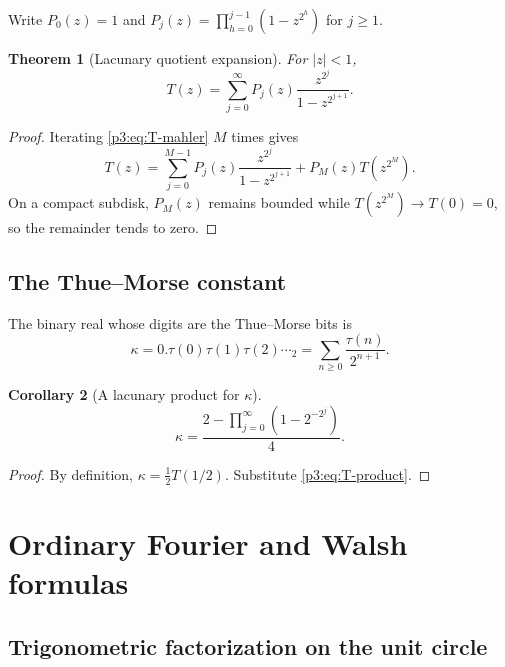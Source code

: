 \documentclass[11pt,oneside]{article}
\newtheorem{theorem}{Theorem}[section]
\newtheorem{corollary}[theorem]{Corollary}
\theoremstyle{definition}
\theoremstyle{remark}
\newcommand{\1}{\mathbf 1}
\begin{document}
Write \(P_0(z)=1\) and \(P_j(z)=\prod_{h=0}^{j-1}(1-z^{2^h})\) for \(j\ge1\).

\begin{theorem}[Lacunary quotient expansion]
\label{p3:thm:lacunary-quotient}
For \(|z|<1\),
\begin{equation}
 \boxed{
 T(z)=\sum_{j=0}^{\infty}
 P_j(z)\frac{z^{2^j}}{1-z^{2^{j+1}}}.}
 \label{p3:eq:lacunary-quotient}
\end{equation}
\end{theorem}

\begin{proof}
Iterating \eqref{p3:eq:T-mahler} \(M\) times gives
\[
 T(z)=\sum_{j=0}^{M-1}P_j(z)\frac{z^{2^j}}{1-z^{2^{j+1}}}
      +P_M(z)T(z^{2^M}).
\]
On a compact subdisk, \(P_M(z)\) remains bounded while \(T(z^{2^M})\to T(0)=0\), so the
remainder tends to zero.
\end{proof}

\subsection{The Thue--Morse constant}

The binary real whose digits are the Thue--Morse bits is
\begin{equation}
 \kappa=0.\tau(0)\tau(1)\tau(2)\cdots{}_2
       =\sum_{n\ge0}\frac{\tau(n)}{2^{n+1}}.
 \label{p3:eq:kappa-def}
\end{equation}

\begin{corollary}[A lacunary product for \(\kappa\)]
\label{p3:cor:kappa}
\begin{equation}
 \boxed{
 \kappa=\frac{2-\displaystyle\prod_{j=0}^{\infty}
                    \left(1-2^{-2^j}\right)}4.}
 \label{p3:eq:kappa-product}
\end{equation}
\end{corollary}

\begin{proof}
By definition, \(\kappa=\tfrac12T(1/2)\).  Substitute \eqref{p3:eq:T-product}.
\end{proof}

\section{Ordinary Fourier and Walsh formulas}
\label{p3:sec:fourier}

\subsection{Trigonometric factorization on the unit circle}
\end{document}
